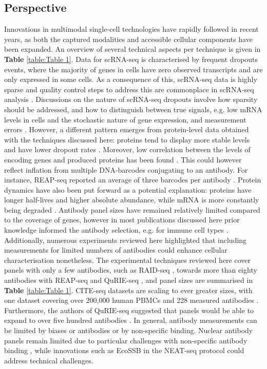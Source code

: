 \documentclass[times, twoside, watermark]{zHenriquesLab-StyleBioRxiv}
\begin{document}
\subsection*{Perspective} Innovations in multimodal single-cell technologies have rapidly followed in recent years, as both the captured modalities and accessible cellular components have been expanded. An overview of several technical aspects per technique is given in \textbf{Table} \ref{table:Table 1}. Data for scRNA-seq is characterised by frequent dropouts events, where the majority of genes in cells have zero observed transcripts and are only expressed in some cells. As a consequence of this, scRNA-seq data is highly sparse and quality control steps to address this are commonplace in scRNA-seq analysis \cite{AlJanahi2018}. Discussions on the nature of scRNA-seq dropouts involve how sparsity should be addressed, and how to distinguish between true signals, e.g. low mRNA levels in cells and the stochastic nature of gene expression, and measurement errors \cite{Qiu2020,Sarkar2021}. However, a different pattern emerges from protein-level data obtained with the techniques discussed here: proteins tend to display more stable levels and have lower dropout rates \cite{Stoeckius2017,Peterson2017,Gerlach2019,Mimitou2019}. Moreover, low correlation between the levels of encoding genes and produced proteins has been found \cite{Stoeckius2017,Peterson2017}. This could however reflect inflation from multiple DNA-barcodes conjugating to an antibody. For instance, REAP-seq reported an average of three barcodes per antibody \cite{Peterson2017}. Protein dynamics have also been put forward as a potential explanation: proteins have longer half-lives and higher absolute abundance, while mRNA is more constantly being degraded \cite{Schwanhusser2011}. \newline Antibody panel sizes have remained relatively limited compared to the coverage of genes, however in most publications discussed here prior knowledge informed the antibody selection, e.g. for immune cell types \cite{Stoeckius2017,Peterson2017}. Additionally, numerous experiments reviewed here highlighted that including measurements for limited numbers of antibodies could enhance cellular characterisation nonetheless. The experimental techniques reviewed here cover panels with only a few antibodies, such as RAID-seq \cite{Gerlach2019}, towards more than eighty antibodies with REAP-seq \cite{Peterson2017} and QuRIE-seq \cite{Rivello2020}, and panel sizes are summarised in \textbf{Table} \ref{table:Table 1}. CITE-seq datasets are scaling to ever greater sizes, with one dataset covering over 200,000 human PBMCs and 228 measured antibodies \cite{Hao2021}. Furthermore, the authors of QuRIE-seq suggested that panels would be able to expand to over five hundred antibodies \cite{Rivello2020}. In general, antibody measurements can be limited by biases or antibodies or by non-specific binding. Nuclear antibody panels remain limited due to particular challenges with non-specific antibody binding \cite{Chung2021,Chen2021}, while innovations such as EcoSSB in the NEAT-seq protocol could address technical challenges. 
\end{document}
